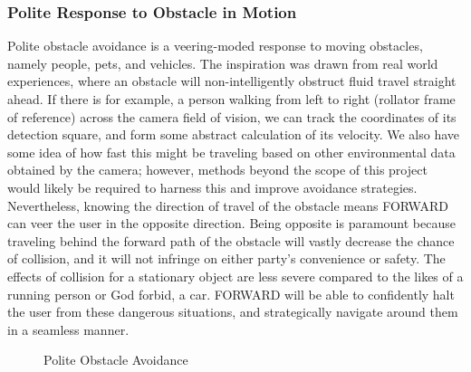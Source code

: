 \subsubsection{Polite Response to Obstacle in Motion}
\noindent Polite obstacle avoidance is a veering-moded response to moving obstacles, namely people, pets, and vehicles. The inspiration was drawn from real world experiences, where an obstacle will non-intelligently obstruct fluid travel straight ahead. If there is for example, a person walking from left to right (rollator frame of reference) across the camera field of vision, we can track the coordinates of its detection square, and form some abstract calculation of its velocity. We also have some idea of how fast this might be traveling based on other environmental data obtained by the camera; however, methods beyond the scope of this project would likely be required to harness this and improve avoidance strategies. Nevertheless, knowing the direction of travel of the obstacle means FORWARD can veer the user in the opposite direction. Being opposite is paramount because traveling behind the forward path of the obstacle will vastly decrease the chance of collision, and it will not infringe on either party's convenience or safety. The effects of collision for a stationary object are less severe compared to the likes of a running person or God forbid, a car. FORWARD will be able to confidently halt the user from these dangerous situations, and strategically navigate around them in a seamless manner.\\
\begin{figure}[H]
	\centering
	\caption{\label{fig:polite}Polite Obstacle Avoidance}
\end{figure}
